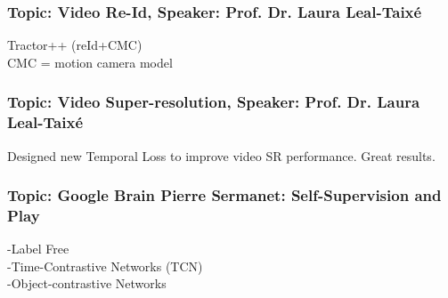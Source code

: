 \subsubsection{Topic: Video Re-Id, Speaker: Prof. Dr. Laura Leal-Taixé}
Tractor++ (reId+CMC)\\
CMC = motion camera model
\subsubsection{Topic: Video Super-resolution, Speaker: Prof. Dr. Laura Leal-Taixé}
Designed new Temporal Loss to improve video SR performance. Great results.
\subsubsection{Topic: Google Brain Pierre Sermanet: Self-Supervision and Play}
-Label Free\\
-Time-Contrastive Networks (TCN)\\
-Object-contrastive Networks\\

